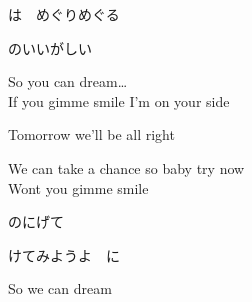 {は　めぐりめぐる

のいいがしい

So you can dream…
\\

If you gimme smile I'm on your side

Tomorrow we'll be all right

We can take a chance so baby try now
\\

Wont you gimme smile

のにげて

けてみようよ　に

So we can dream

}